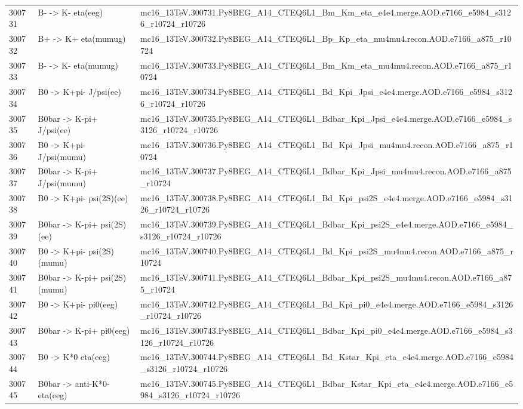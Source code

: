 \begin{table}[ht]
{\begin{tabular}{l l l}
300731 & B- -> K- eta(eeg) & mc16\_13TeV.300731.Py8BEG\_A14\_CTEQ6L1\_Bm\_Km\_eta\_e4e4.merge.AOD.e7166\_e5984\_s3126\_r10724\_r10726 \\
300732 & B+ -> K+ eta(mumug) & mc16\_13TeV.300732.Py8BEG\_A14\_CTEQ6L1\_Bp\_Kp\_eta\_mu4mu4.recon.AOD.e7166\_a875\_r10724 \\
300733 & B- -> K- eta(mumug) & mc16\_13TeV.300733.Py8BEG\_A14\_CTEQ6L1\_Bm\_Km\_eta\_mu4mu4.recon.AOD.e7166\_a875\_r10724 \\
300734 & B0 -> K+pi- J/psi(ee) & mc16\_13TeV.300734.Py8BEG\_A14\_CTEQ6L1\_Bd\_Kpi\_Jpsi\_e4e4.merge.AOD.e7166\_e5984\_s3126\_r10724\_r10726 \\
300735 & B0bar -> K-pi+ J/psi(ee) & mc16\_13TeV.300735.Py8BEG\_A14\_CTEQ6L1\_Bdbar\_Kpi\_Jpsi\_e4e4.merge.AOD.e7166\_e5984\_s3126\_r10724\_r10726 \\
300736 & B0 -> K+pi- J/psi(mumu) & mc16\_13TeV.300736.Py8BEG\_A14\_CTEQ6L1\_Bd\_Kpi\_Jpsi\_mu4mu4.recon.AOD.e7166\_a875\_r10724 \\
300737 & B0bar -> K-pi+ J/psi(mumu) & mc16\_13TeV.300737.Py8BEG\_A14\_CTEQ6L1\_Bdbar\_Kpi\_Jpsi\_mu4mu4.recon.AOD.e7166\_a875\_r10724 \\
300738 & B0 -> K+pi- psi(2S)(ee) & mc16\_13TeV.300738.Py8BEG\_A14\_CTEQ6L1\_Bd\_Kpi\_psi2S\_e4e4.merge.AOD.e7166\_e5984\_s3126\_r10724\_r10726 \\
300739 & B0bar -> K-pi+ psi(2S)(ee) & mc16\_13TeV.300739.Py8BEG\_A14\_CTEQ6L1\_Bdbar\_Kpi\_psi2S\_e4e4.merge.AOD.e7166\_e5984\_s3126\_r10724\_r10726 \\
300740 & B0 -> K+pi- psi(2S)(mumu) & mc16\_13TeV.300740.Py8BEG\_A14\_CTEQ6L1\_Bd\_Kpi\_psi2S\_mu4mu4.recon.AOD.e7166\_a875\_r10724 \\
300741 & B0bar -> K-pi+ psi(2S)(mumu) & mc16\_13TeV.300741.Py8BEG\_A14\_CTEQ6L1\_Bdbar\_Kpi\_psi2S\_mu4mu4.recon.AOD.e7166\_a875\_r10724 \\
300742 & B0 -> K+pi- pi0(eeg) & mc16\_13TeV.300742.Py8BEG\_A14\_CTEQ6L1\_Bd\_Kpi\_pi0\_e4e4.merge.AOD.e7166\_e5984\_s3126\_r10724\_r10726 \\
300743 & B0bar -> K-pi+ pi0(eeg) & mc16\_13TeV.300743.Py8BEG\_A14\_CTEQ6L1\_Bdbar\_Kpi\_pi0\_e4e4.merge.AOD.e7166\_e5984\_s3126\_r10724\_r10726 \\
300744 & B0 -> K*0 eta(eeg) & mc16\_13TeV.300744.Py8BEG\_A14\_CTEQ6L1\_Bd\_Kstar\_Kpi\_eta\_e4e4.merge.AOD.e7166\_e5984\_s3126\_r10724\_r10726 \\
300745 & B0bar -> anti-K*0- eta(eeg) & mc16\_13TeV.300745.Py8BEG\_A14\_CTEQ6L1\_Bdbar\_Kstar\_Kpi\_eta\_e4e4.merge.AOD.e7166\_e5984\_s3126\_r10724\_r10726 \\

\end{tabular}}
\end{table}
